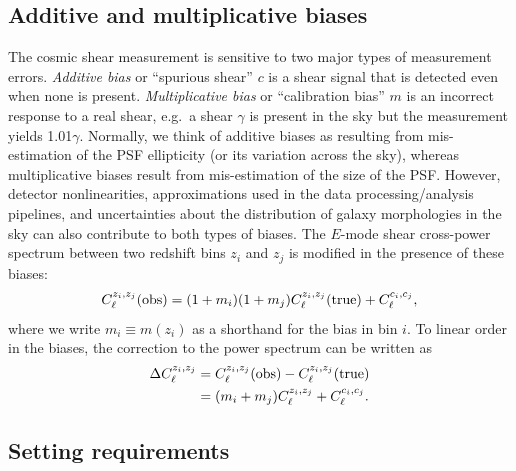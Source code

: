 \documentclass[aps,prd, amsmath,amssymb,superscriptaddress,showkeys,nofootinbib,reprint,preprintnumbers]{revtex4-1}
\begin{document}
\subsection{Additive and multiplicative biases}
\label{ss:add_mult}

The cosmic shear measurement is sensitive to two major types of
measurement errors. {\em Additive bias} or ``spurious shear'' $c$ is a
shear signal that is detected even when none is present. {\em
Multiplicative bias} or ``calibration bias'' $m$ is an incorrect response
to a real shear, e.g.\ a shear $\gamma$ is present in the sky but the
measurement yields 1.01$\gamma$. Normally, we think of additive biases
as resulting from mis-estimation of the PSF ellipticity (or its
variation across the sky), whereas multiplicative biases result from
mis-estimation of the size of the PSF. However, detector
nonlinearities, approximations used in the data processing/analysis
pipelines, and uncertainties about the distribution of galaxy
morphologies in the sky can also contribute to both types of
biases.  The $E$-mode
shear cross-power spectrum between two redshift bins $z_i$ and $z_j$
is modified in the presence of these biases:
\begin{equation}
C_\ell^{z_i,z_j}({\rm obs}) = (1+m_i)(1+m_j)C_\ell^{z_i,z_j}({\rm true}) + C_\ell^{c_i,c_j},
\label{eq:mod}
\end{equation}
where we write $m_i\equiv m(z_i)$ as a shorthand for the bias in bin $i$. To linear order in
the biases, the correction to the power spectrum can be written as
\begin{align}
\Delta C_\ell^{z_i,z_j} &= C_\ell^{z_i,z_j}({\rm obs}) - C_\ell^{z_i,z_j}({\rm true}) \nonumber\\
&= (m_i+m_j)C_\ell^{z_i,z_j}+C_\ell^{c_i,c_j}.
\label{eq:Delta C}
\end{align}

\subsection{Setting requirements}
\end{document}
